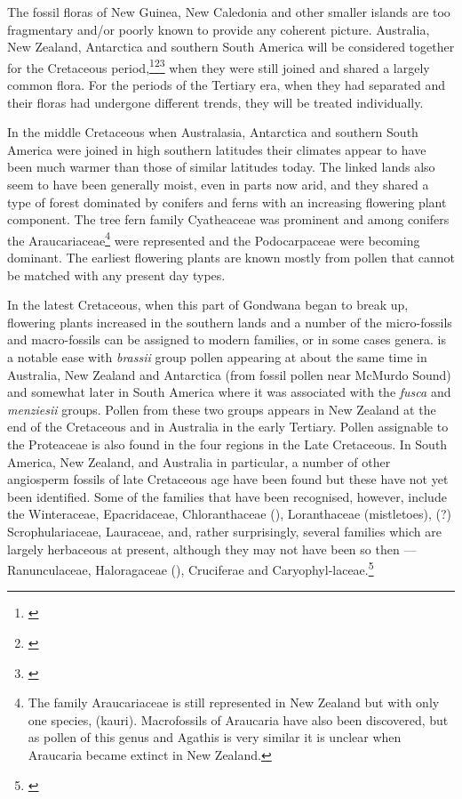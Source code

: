The fossil floras of New Guinea, New Caledonia and other smaller islands are too fragmentary and/or poorly known to provide any coherent picture.
Australia, New Zealand, Antarctica and southern South America will be considered together for the Cretaceous period,\footnote{\cite{mildenhall1980new}}\footnote{\cite{wace1965vascular}}\footnote{\cite{dettmann1981cretaceous}} when they were still joined and shared a largely common flora.
For the periods of the Tertiary era, when they had separated and their floras had undergone different trends, they will be treated individually.

In the middle Cretaceous when Australasia, Antarctica and southern South America were joined in high southern latitudes their climates appear to have been much warmer than those of similar latitudes today.
The linked lands also seem to have been generally moist, even in parts now arid, and they shared a type of forest dominated by conifers and ferns with an increasing flowering plant component.
The tree fern family Cyatheaceae was prominent and among conifers the Araucariaceae\footnote{The family Araucariaceae is still represented in New Zealand but with only one species,  (kauri). Macrofossils of Araucaria have also been discovered, but as pollen of this genus and Agathis is very similar it is unclear when Araucaria became extinct in New Zealand.} were represented and the Podocarpaceae were becoming dominant.
The earliest flowering plants are known mostly from pollen that cannot be matched with any present day types.

In the latest Cretaceous, when this part of Gondwana began to break up, flowering plants increased in the southern lands and a number of the micro-fossils and macro-fossils can be assigned to modern families, or in some cases genera.  is a notable ease with \emph{brassii} group pollen appearing at about the same time in Australia, New Zealand and Antarctica (from fossil pollen near McMurdo Sound) and somewhat later in South America where it was associated with the \emph{fusca} and \emph{menziesii} groups.
Pollen from these two groups appears in New Zealand at the end of the Cretaceous and in Australia in the early Tertiary.
Pollen assignable to the Proteaceae is also found in the four regions in the Late Cretaceous.
In South America, New Zealand, and Australia in particular, a number of other angiosperm fossils of late Cretaceous age have been found but these have not yet been identified.
Some of the families that have been recognised, however, include the Winteraceae, Epacridaceae, Chloranthaceae (), Loranthaceae (mistletoes), (?) Scrophulariaceae, Lauraceae, and, rather surprisingly, several families which are largely herbaceous at present, although they may not have been so then --- Ranunculaceae, Haloragaceae (), Cruciferae and Caryophyl-laceae.\footnote{\cite{mildenhall1980new}}

